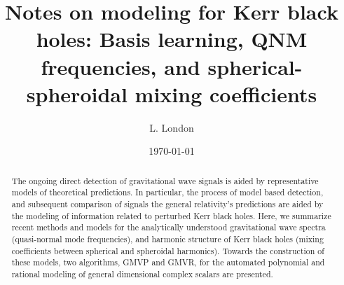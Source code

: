 \documentclass[twocolumn,aps,prd,floatfix,preprintnumbers,a4paper,nofootinbib,
superscriptaddress,10pt]{revtex4-1}
\begin{document}

\title{Notes on modeling for Kerr black holes: Basis learning, QNM frequencies, and spherical-spheroidal mixing coefficients }

\author{L. London}

\begin{abstract}
	The ongoing direct detection of gravitational wave signals is aided by representative models of theoretical predictions. In particular, the process of model based detection, and subsequent comparison of signals the general relativity's predictions are aided by the modeling of information related to perturbed Kerr black holes. Here, we summarize recent methods and models for the analytically understood gravitational wave spectra (quasi-normal mode frequencies), and harmonic structure of Kerr black holes (mixing coefficients between spherical and spheroidal harmonics). Towards the construction of these models, two algorithms, GMVP and GMVR, for the automated polynomial and rational modeling of general dimensional complex scalars are presented.
\end{abstract}

\date{\today}

\maketitle
\end{document}
